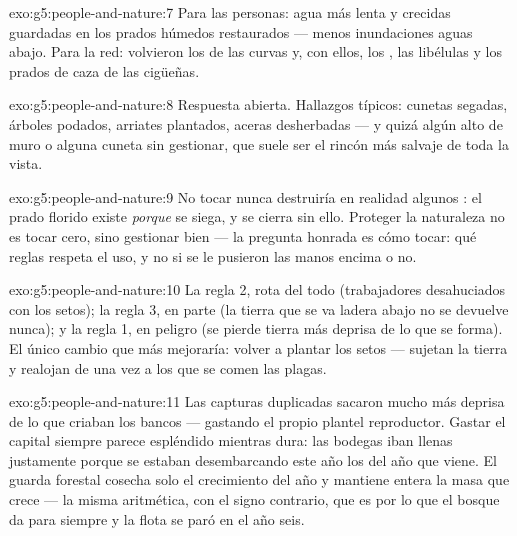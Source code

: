 \begin{solution}{exo:g5:people-and-nature:7}
Para las personas: agua más lenta y crecidas guardadas en los prados
húmedos restaurados --- menos inundaciones aguas abajo. Para la red:
volvieron los  de las curvas y, con ellos, los , las
libélulas y los prados de caza de las cigüeñas.
\end{solution}

\begin{solution}{exo:g5:people-and-nature:8}
Respuesta abierta. Hallazgos típicos: cunetas segadas, árboles
podados, arriates plantados, aceras desherbadas --- y quizá algún alto
de muro o alguna cuneta sin gestionar, que suele ser el rincón más
salvaje de toda la vista.
\end{solution}

\begin{solution}{exo:g5:people-and-nature:9}
No tocar nunca destruiría en realidad algunos : el prado
florido existe \emph{porque} se siega, y se cierra sin ello. Proteger
la naturaleza no es tocar cero, sino gestionar bien --- la pregunta
honrada es cómo tocar: qué reglas respeta el uso, y no si se le pusieron
las manos encima o no.
\end{solution}

\begin{solution}{exo:g5:people-and-nature:10}
La regla 2, rota del todo (trabajadores desahuciados con los setos);
la regla 3, en parte (la tierra que se va ladera abajo no se devuelve
nunca); y la regla 1, en peligro (se pierde tierra más deprisa de lo
que se forma). El único cambio que más mejoraría: volver a plantar los
setos --- sujetan la tierra y realojan de una vez a los que se comen
las plagas.
\end{solution}

\begin{solution}{exo:g5:people-and-nature:11}
Las capturas duplicadas sacaron  mucho más deprisa de lo que
criaban los bancos --- gastando el propio plantel reproductor. Gastar
el capital siempre parece espléndido mientras dura: las bodegas iban
llenas justamente porque se estaban desembarcando este año los 
del año que viene. El guarda forestal cosecha solo el crecimiento del
año y mantiene entera la masa que crece --- la misma aritmética, con el
signo contrario, que es por lo que el bosque da para siempre y la
flota se paró en el año seis.
\end{solution}
